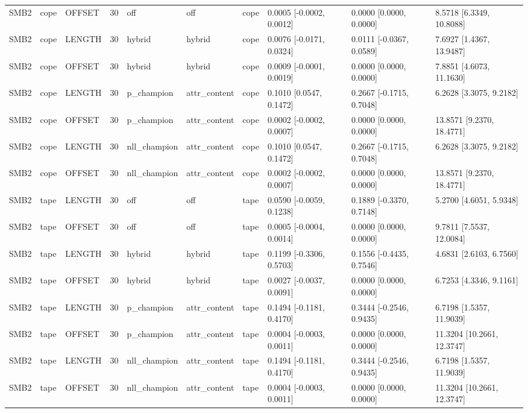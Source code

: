 \begin{tabular}{llllllllll}
SMB2 & cope & OFFSET & 30 & off & off & cope & 0.0005 [-0.0002, 0.0012] & 0.0000 [0.0000, 0.0000] & 8.5718 [6.3349, 10.8088] \\
SMB2 & cope & LENGTH & 30 & hybrid & hybrid & cope & 0.0076 [-0.0171, 0.0324] & 0.0111 [-0.0367, 0.0589] & 7.6927 [1.4367, 13.9487] \\
SMB2 & cope & OFFSET & 30 & hybrid & hybrid & cope & 0.0009 [-0.0001, 0.0019] & 0.0000 [0.0000, 0.0000] & 7.8851 [4.6073, 11.1630] \\
SMB2 & cope & LENGTH & 30 & p\_champion & attr\_content & cope & 0.1010 [0.0547, 0.1472] & 0.2667 [-0.1715, 0.7048] & 6.2628 [3.3075, 9.2182] \\
SMB2 & cope & OFFSET & 30 & p\_champion & attr\_content & cope & 0.0002 [-0.0002, 0.0007] & 0.0000 [0.0000, 0.0000] & 13.8571 [9.2370, 18.4771] \\
SMB2 & cope & LENGTH & 30 & nll\_champion & attr\_content & cope & 0.1010 [0.0547, 0.1472] & 0.2667 [-0.1715, 0.7048] & 6.2628 [3.3075, 9.2182] \\
SMB2 & cope & OFFSET & 30 & nll\_champion & attr\_content & cope & 0.0002 [-0.0002, 0.0007] & 0.0000 [0.0000, 0.0000] & 13.8571 [9.2370, 18.4771] \\
SMB2 & tape & LENGTH & 30 & off & off & tape & 0.0590 [-0.0059, 0.1238] & 0.1889 [-0.3370, 0.7148] & 5.2700 [4.6051, 5.9348] \\
SMB2 & tape & OFFSET & 30 & off & off & tape & 0.0005 [-0.0004, 0.0014] & 0.0000 [0.0000, 0.0000] & 9.7811 [7.5537, 12.0084] \\
SMB2 & tape & LENGTH & 30 & hybrid & hybrid & tape & 0.1199 [-0.3306, 0.5703] & 0.1556 [-0.4435, 0.7546] & 4.6831 [2.6103, 6.7560] \\
SMB2 & tape & OFFSET & 30 & hybrid & hybrid & tape & 0.0027 [-0.0037, 0.0091] & 0.0000 [0.0000, 0.0000] & 6.7253 [4.3346, 9.1161] \\
SMB2 & tape & LENGTH & 30 & p\_champion & attr\_content & tape & 0.1494 [-0.1181, 0.4170] & 0.3444 [-0.2546, 0.9435] & 6.7198 [1.5357, 11.9039] \\
SMB2 & tape & OFFSET & 30 & p\_champion & attr\_content & tape & 0.0004 [-0.0003, 0.0011] & 0.0000 [0.0000, 0.0000] & 11.3204 [10.2661, 12.3747] \\
SMB2 & tape & LENGTH & 30 & nll\_champion & attr\_content & tape & 0.1494 [-0.1181, 0.4170] & 0.3444 [-0.2546, 0.9435] & 6.7198 [1.5357, 11.9039] \\
SMB2 & tape & OFFSET & 30 & nll\_champion & attr\_content & tape & 0.0004 [-0.0003, 0.0011] & 0.0000 [0.0000, 0.0000] & 11.3204 [10.2661, 12.3747] \\

\end{tabular}
